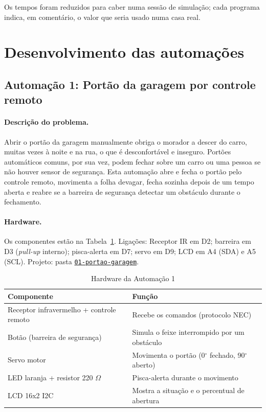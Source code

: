 \documentclass[12pt]{article}
\newcommand{\repositorio}{https://github.com/USUARIO/REPOSITORIO}
\newcommand{\pasta}[1]{\href{\repositorio/tree/main/#1}{\texttt{#1}}}
\begin{document}
Os tempos foram reduzidos para caber numa sessão de simulação; cada programa indica, em comentário, o valor que seria usado numa casa real.

\section{Desenvolvimento das automações}\label{sec:desenv}

\subsection{Automação 1: Portão da garagem por controle remoto}\label{sub:a1}

\paragraph{Descrição do problema.} Abrir o portão da garagem manualmente obriga o morador a descer do carro, muitas vezes à noite e na rua, o que é desconfortável e inseguro. Portões automáticos comuns, por sua vez, podem fechar sobre um carro ou uma pessoa se não houver sensor de segurança. Esta automação abre e fecha o portão pelo controle remoto, movimenta a folha devagar, fecha sozinha depois de um tempo aberta e reabre se a barreira de segurança detectar um obstáculo durante o fechamento.

\paragraph{Hardware.} Os componentes estão na Tabela~\ref{tab:hw1}. Ligações: Receptor IR em D2; barreira em D3 (\emph{pull-up} interno); pisca-alerta em D7; servo em D9; LCD em A4 (SDA) e A5 (SCL). Projeto: pasta \pasta{01-portao-garagem}.

\begin{table}[ht]
\centering
\caption{Hardware da Automação 1}\label{tab:hw1}
\footnotesize
\begin{tabularx}{\textwidth}{lX}
\toprule
Componente & Função \\
\midrule
Receptor infravermelho + controle remoto & Recebe os comandos (protocolo NEC) \\
Botão (barreira de segurança) & Simula o feixe interrompido por um obstáculo \\
Servo motor & Movimenta o portão (0$^\circ$ fechado, 90$^\circ$ aberto) \\
LED laranja + resistor 220 $\Omega$ & Pisca-alerta durante o movimento \\
LCD 16x2 I2C & Mostra a situação e o percentual de abertura \\
\bottomrule
\end{tabularx}
\end{table}
\end{document}
